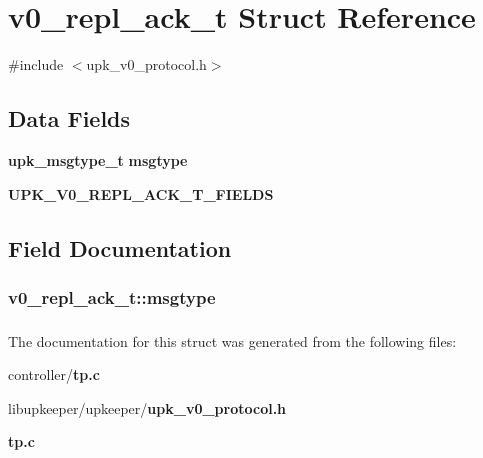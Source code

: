 \section{v0\_\-repl\_\-ack\_\-t Struct Reference}
\label{structv0__repl__ack__t}


{\ttfamily \#include $<$upk\_\-v0\_\-protocol.h$>$}

\subsection*{Data Fields}
\begin{DoxyCompactItemize}
\item 
{\bf upk\_\-msgtype\_\-t} {\bf msgtype}
\item 
{\bf UPK\_\-V0\_\-REPL\_\-ACK\_\-T\_\-FIELDS}
\end{DoxyCompactItemize}


\subsection{Field Documentation}
\subsubsection[{msgtype}]{ {\bf v0\_\-repl\_\-ack\_\-t::msgtype}}\label{structv0__repl__ack__t_a77b71e25779b76a260da685a33155b5b}
\subsubsection[{UPK\_\-V0\_\-REPL\_\-ACK\_\-T\_\-FIELDS}]{}\label{structv0__repl__ack__t_a4e10398e36bbb6f9757f846749796eee}


The documentation for this struct was generated from the following files:\begin{DoxyCompactItemize}
\item 
controller/{\bf tp.c}\item 
libupkeeper/upkeeper/{\bf upk\_\-v0\_\-protocol.h}\item 
{\bf tp.c}\end{DoxyCompactItemize}
